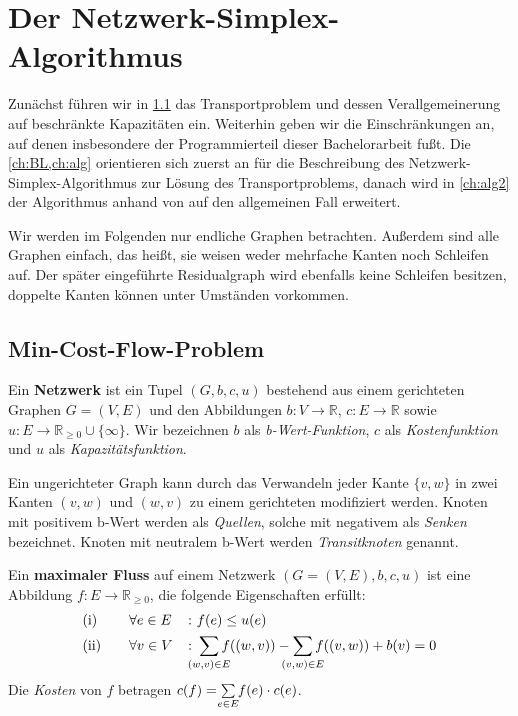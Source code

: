 \chapter{Der Netzwerk-Simplex-Algorithmus}\label{ch:NSA}
Zunächst führen wir in \cref{ch:MCF} das Transportproblem und dessen Verallgemeinerung auf beschränkte Kapazitäten ein. Weiterhin geben wir die Einschränkungen an, auf denen insbesondere der Programmierteil dieser Bachelorarbeit fußt. Die \cref{ch:BL,ch:alg} orientieren sich zuerst an \cite[S. 291\,ff.]{NSAbook} für die Beschreibung des Netzwerk-Simplex-Algorithmus zur Lösung des Transportproblems, danach wird in \cref{ch:alg2} der Algorithmus anhand von \cite[S. 353\,ff.]{NSAbook} auf den allgemeinen Fall erweitert.

Wir werden im Folgenden nur endliche Graphen betrachten. Außerdem sind alle Graphen einfach, das heißt, sie weisen weder mehrfache Kanten noch Schleifen auf. Der später eingeführte Residualgraph wird ebenfalls keine Schleifen besitzen, doppelte Kanten können unter Umständen vorkommen.

\section{Min-Cost-Flow-Problem}\label{ch:MCF}
\begin{defn}Ein \textbf{Netzwerk} ist ein Tupel $(G,b,c,u)$ bestehend aus einem gerichteten Graphen $G = (V,E)$ und den Abbildungen $b \colon V\rightarrow\mathbb{R}$, $c \colon E\rightarrow\mathbb{R}$ sowie $u \colon E\rightarrow\mathbb{R}_{\geq 0}\cup \{\infty\}$. Wir bezeichnen $b$ als \emph{b-Wert-Funktion}, $c$ als \emph{Kostenfunktion} und $u$ als \emph{Kapazitätsfunktion}.\end{defn}
\begin{anm}Ein ungerichteter Graph kann durch das Verwandeln jeder Kante $\{v,w\}$ in zwei Kanten $(v,w)$ und $(w,v)$ zu einem gerichteten modifiziert werden. Knoten mit positivem b-Wert werden als \emph{Quellen}, solche mit negativem als \emph{Senken} bezeichnet. Knoten mit neutralem b-Wert werden \emph{Transitknoten} genannt.\end{anm}

\begin{defn}\label{DefMaxFlow}Ein \textbf{maximaler Fluss} auf einem Netzwerk $(G=(V,E),b,c,u)$ ist eine Abbildung $f \colon E\rightarrow\mathbb{R}_{\geq 0}$, die folgende Eigenschaften erfüllt:
\begin{alignat}{3}
&\text{(i)}\quad&&\forall e\in E &&\colon f(e)\leq u(e)\nonumber\\
&\text{(ii)}\quad&&\forall v\in V &&\colon \sum_{\mathclap{(w,v)\in E}} f((w,v)) - \sum_{\mathclap{(v,w)\in E}} f((v,w)) + b(v) = 0\label{DefMaxFlowII}
\end{alignat}
Die \emph{Kosten} von $f$ betragen $c(f) = \sum\limits_{\mathclap{e\in E}} f(e)\cdot c(e)$.
\end{defn}

